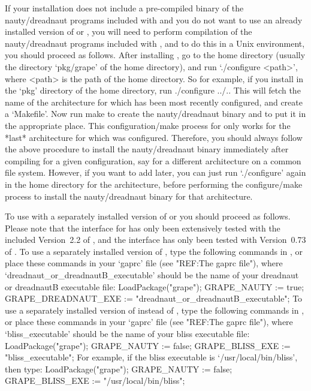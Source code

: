 If your {\GRAPE} installation does not include a pre-compiled binary of 
the nauty/dreadnaut programs included with {\GRAPE} and you do not want 
to use an already installed version of {\nauty} or {\bliss}, you will 
need to perform compilation of the nauty/dreadnaut programs included with
{\GRAPE}, and to do this in a Unix environment, you should proceed as
follows.  After installing {\GAP}, go to the {\GRAPE} home directory
(usually the directory `pkg/grape' of the {\GAP} home directory),
and run `./configure <path>', where <path> is the path of the {\GAP}
home directory.  So for example, if you install {\GRAPE} in the `pkg'
directory of the {\GAP} home directory, run 
\begintt 
./configure ../..
\endtt 
This will fetch the name of the architecture for which {\GAP}
has been most recently configured, and create a `Makefile'. Now run
\begintt 
make 
\endtt 
to create the nauty/dreadnaut binary and to put
it in the appropriate place.  This configuration/make process for
{\GRAPE} only works for the *last* architecture for which {\GAP} was
configured. Therefore, you should always follow the above procedure to
install the nauty/dreadnaut binary immediately after compiling {\GAP}
for a given configuration, say for a different architecture on a common
file system. However, if you want to add {\GRAPE} later, you can just run
`./configure' again in the {\GAP} home directory for the architecture,
before performing the {\GRAPE} configure/make process to install the
nauty/dreadnaut binary for that architecture.

To use {\GRAPE} with a separately installed version of {\nauty} or
{\bliss} you should proceed as follows. Please note that the {\nauty}
interface for {\GRAPE} has only been extensively tested with the
included Version~2.2 of {\nauty}, and the {\bliss} interface has only
been tested with Version~0.73 of {\bliss}. To use a separately
installed version of {\nauty}, type the following commands in {\GAP}, or 
place these commands in your `gaprc' file (see "REF:The gaprc file"), where
`dreadnaut_or_dreadnautB_executable' should be the name of your
dreadnaut or dreadnautB executable file:
\begintt
LoadPackage("grape"); 
GRAPE_NAUTY := true; 
GRAPE_DREADNAUT_EXE := "dreadnaut_or_dreadnautB_executable"; 
\endtt 
To use a separately installed version of {\bliss} instead of {\nauty},
type the following commands in {\GAP}, or place these commands in your
`gaprc' file (see "REF:The gaprc file"), where `bliss_executable' should be
the name of your bliss executable file:
\begintt
LoadPackage("grape"); 
GRAPE_NAUTY := false; 
GRAPE_BLISS_EXE := "bliss_executable"; 
\endtt 
For example, if the bliss executable is `/usr/local/bin/bliss', then type:
\begintt
LoadPackage("grape"); 
GRAPE_NAUTY := false; 
GRAPE_BLISS_EXE := "/usr/local/bin/bliss"; 
\endtt 

